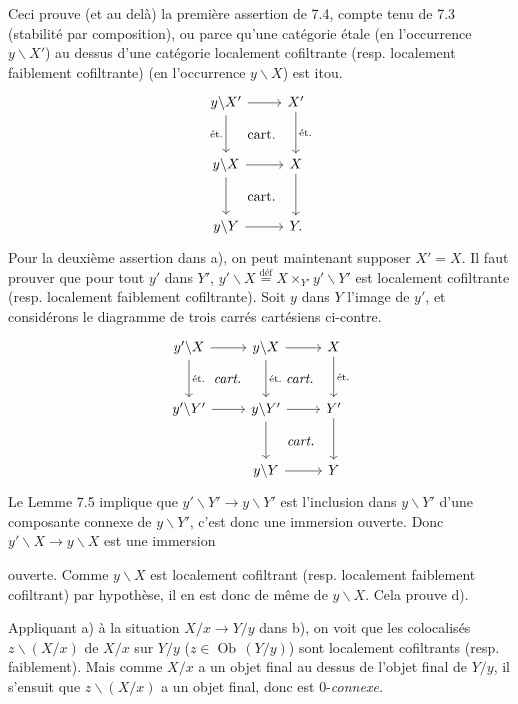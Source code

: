 \documentclass[11pt]{article}
\newcommand{\printedpage}[1]{\marginpar{\footnotesize p.~#1}}
\newcommand{\msp}[1]{\marginpar{\footnotesize [#1]}}
\newcommand{\Ob}{\operatorname{Ob}}
\newcommand{\margmark}[1]{\marginpar{\footnotesize #1}}
\begin{document}
Ceci prouve (et au delà) la première assertion de 7.4, compte tenu de 7.3 (stabilité par composition), ou parce qu'une \msp{page 94} catégorie étale (en l'occurrence $y\backslash X'$) au dessus d'une catégorie localement cofiltrante (resp. localement faiblement cofiltrante) (en l'occurrence $y\backslash X$) est itou.
\[
\begin{tikzcd}[row sep=large]
y\backslash X' \arrow[r] \arrow[d, "\text{ét.}"'] \arrow[dr, phantom, "\text{cart.}"] & X' \arrow[d, "\text{ét.}"] \\
y\backslash X \arrow[r] \arrow[d] \arrow[dr, phantom, "\text{cart.}"] & X \arrow[d] \\
y\backslash Y \arrow[r] & Y.
\end{tikzcd}
\]
Pour la deuxième assertion dans a), on peut maintenant supposer $X' = X$. Il faut prouver que pour tout $y'$ dans $Y'$, $y'\backslash X \overset{\text{déf}}{=} X \times_{Y'} y'\backslash Y'$ est localement cofiltrante (resp. localement faiblement cofiltrante). Soit $y$ dans $Y$ l'image de $y'$, et considérons le diagramme de trois carrés cartésiens ci-contre.
\[
\begin{tikzcd}[row sep=large]
y'\backslash X \arrow[r] \arrow[d, "\text{ét.}"] \arrow[dr, phantom, "\textit{cart.}"] & y\backslash X \arrow[r] \arrow[d, "\text{ét.}"] \arrow[dr, phantom, "\textit{cart.}"] & X \arrow[d, "\text{ét.}"] \\
y'\backslash Y' \arrow[r] & y\backslash Y' \arrow[r] \arrow[d] \arrow[dr, phantom, "\textit{cart.}"] & Y' \arrow[d] \\
 & y\backslash Y \arrow[r] & Y
\end{tikzcd}
\]
Le Lemme 7.5 implique que $y'\backslash Y' \longrightarrow y\backslash Y'$ est l'inclusion dans $y\backslash Y'$ d'une composante connexe de $y\backslash Y'$, c'est donc une immersion ouverte. Donc $y'\backslash X \longrightarrow y\backslash X$ est une immersion

\printedpage{59}

ouverte. Comme $y\backslash X$ est localement cofiltrant (resp. localement faiblement cofiltrant) par hypothèse, il en est donc de même de $y\backslash X$. Cela prouve d).

Appliquant a) à la situation $X/x \longrightarrow Y/y$ dans b), on voit que les colocalisés $z\backslash(X/x)$ de
\margmark{!} %
$X/x$ sur $Y/y$ ($z \in \Ob\,(Y/y)$) sont localement cofiltrants (resp. faiblement). Mais comme $X/x$ a un objet final au dessus de l'objet final de $Y/y$, il s'ensuit que $z\backslash(X/x)$ a un objet final, donc est $0$-\textit{connexe.}
\end{document}
